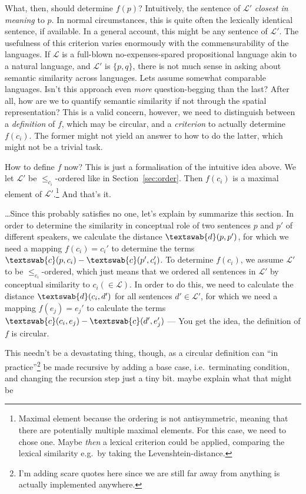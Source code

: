 \documentclass[11pt, a4paper]{scrartcl}
\renewcommand{\i}[1]{\emph{#1}}
\renewcommand{\L}{\mathcal{L}}
\newcommand{\m}[1]{\textswab{#1}}
\begin{document}
What, then, should determine $f(p)$? Intuitively, the sentence of $\L'$ \i{closest in meaning} to $p$. In normal circumstances, this is quite often the lexically identical sentence, if available. In a general account, this might be any sentence of $\L'$. The usefulness of this criterion varies enormously with the commensurability of the languages. If $\L$ is a full-blown no-expenses-spared propositional language akin to a natural language, and $\L'$ is $\{p, q\}$, there is not much sense in asking about semantic similarity across languages. Lets assume somewhat comparable languages. Isn't this approach even \i{more} question-begging than the last? After all, how are we to quantify semantic similarity if not through the spatial representation? This is a valid concern, however, we need to distinguish between a \i{definition} of $f$, which may be circular, and a \i{criterion} to actually determine $f(c_i)$. The former might not yield an answer to how to do the latter, which might not be a trivial task.

How to define $f$ now? This is just a formalisation of the intuitive idea above. 
We let $\L'$ be $\leqslant_{c_i}$-ordered like in Section~\ref{sec:order}. Then $f(c_i)$ is a maximal element of $\L'$.\footnote{Maximal element because the ordering is not antisymmetric, meaning that there are potentially multiple maximal elements. For this case, we need to chose one. Maybe \i{then} a lexical criterion could be applied, comparing the lexical similarity e.g.\ by taking the Levenshtein-distance.} And that's it. 

\ldots Since this probably satisfies no one, let's explain by summarize this section. In order to determine the similarity in conceptual role of two sentences $p$ and $p'$ of different speakers, we calculate the distance $\m{d}(p,p')$, for which we need a mapping $f(c_i) = c_i'$ to determine the terms $\m{c}(p,c_i) - \m{c}(p',c_i')$. To determine $f(c_i)$, we assume $\L'$ to be $\leqslant_{c_i}$-ordered, which just means that we ordered all sentences in $\L'$ by conceptual similarity to $c_i (\in \L)$. In order to do this, we need to calculate the distance $\m{d}(c_i,d')$ for all sentences $d' \in \L'$, for which we need a mapping $f(e_j) = e_j'$ to calculate the terms $\m{c}(c_i,e_j) - \m{c}(d',e_j')$ --- You get the idea, the definition of $f$ is circular. 

This needn't be a devastating thing, though, as a circular definition can ``in practice''\footnote{I'm adding scare quotes here since we are still far away from anything is actually implemented anywhere.} be made recursive by adding a base case, i.e.\ terminating condition, and changing the recursion step just a tiny bit. {\color{red} maybe explain what that might be} 
\end{document}
